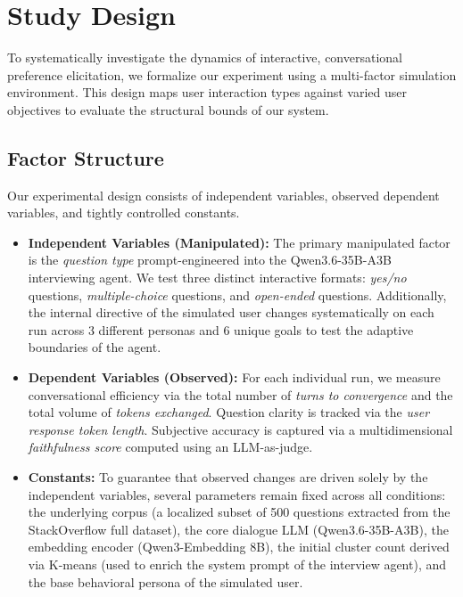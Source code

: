 \section{Study Design}
\label{sec:study_design}

To systematically investigate the dynamics of interactive, conversational preference elicitation, we formalize our experiment using a multi-factor simulation environment. 
This design maps user interaction types against varied user objectives to evaluate the structural bounds of our system.

\subsection{Factor Structure}
Our experimental design consists of independent variables, observed dependent variables, and tightly controlled constants.

\begin{itemize}
    \item \textbf{Independent Variables (Manipulated):} 
    The primary manipulated factor is the \textit{question type} prompt-engineered into the Qwen3.6-35B-A3B interviewing agent. 
    We test three distinct interactive formats: 
    \textit{yes/no} questions, \textit{multiple-choice} questions, and \textit{open-ended} questions. 
    Additionally, the internal directive of the simulated user changes systematically on each run across 3 different personas and 6 unique goals to test the adaptive boundaries of the agent.
    \item \textbf{Dependent Variables (Observed):} 
    For each individual run, we measure conversational efficiency via the total number of \textit{turns to convergence} and the total volume of \textit{tokens exchanged}. 
    Question clarity is tracked via the \textit{user response token length}. 
    Subjective accuracy is captured via a multidimensional \textit{faithfulness score} computed using an LLM-as-judge.
    \item \textbf{Constants:} 
    To guarantee that observed changes are driven solely by the independent variables, several parameters remain fixed across all conditions: 
    the underlying corpus (a localized subset of 500 questions extracted from the StackOverflow full dataset), the core dialogue LLM (Qwen3.6-35B-A3B), the embedding encoder (Qwen3-Embedding 8B), the initial cluster count derived via K-means (used to enrich the system prompt of the interview agent), and the base behavioral persona of the simulated user.
\end{itemize}

